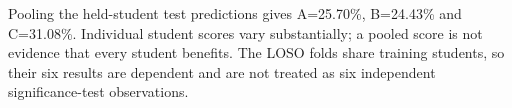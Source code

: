 Pooling the held-student test predictions gives A=25.70\%, B=24.43\% and C=31.08\%. Individual student scores vary substantially; a pooled score is not evidence that every student benefits. The LOSO folds share training students, so their six results are dependent and are not treated as six independent significance-test observations.
